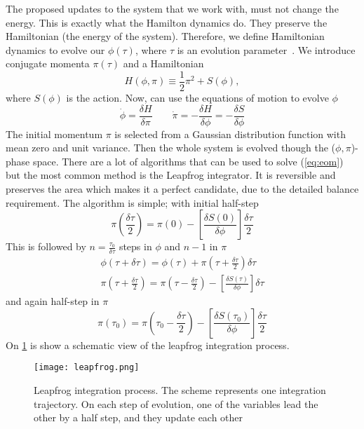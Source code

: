 The proposed updates to the system that we work with, must not change the energy. This is exactly what the Hamilton dynamics do. They preserve the Hamiltonian (the energy of the system). Therefore, we define Hamiltonian dynamics to evolve our $\phi(\tau)$, where $\tau$ is an evolution parameter~\cite{hmc}. We introduce conjugate momenta $\pi(\tau)$ and a Hamiltonian 
\begin{equation}
    H(\phi,\pi) \equiv \frac{1}{2}\pi^2 + S(\phi),
\end{equation}
where $S(\phi)$ is the action. Now, can use the equations of motion to evolve $\phi$
\begin{equation}
    \dot{\phi} = \frac{\delta H}{\delta \pi} \qquad \dot{\pi} = - \frac{\delta H}{\delta \phi} = - \frac{\delta S}{\delta \phi}
    \label{eq:eom}
\end{equation}
The initial momentum $\pi$ is selected from a Gaussian distribution function with mean zero and unit variance. Then the whole system is evolved though the ($\phi,\pi$)-phase space. There are a lot of algorithms that can be used to solve (\cref{eq:eom}) but the most common method is the Leapfrog integrator. It is reversible and preserves the area which makes it a perfect candidate, due to the detailed balance requirement. The algorithm is simple; with initial half-step
\begin{equation}
    \pi\left(\frac{\delta\tau}{2}\right) = \pi\left(0\right) - \left[ \frac{\delta S(0)}{\delta\phi} \right] \frac{\delta\tau}{2}
\end{equation}
This is followed by $n=\frac{\tau_0}{\delta\tau}$ steps in $\phi$ and $n-1$ in $\pi$
\begin{equation}
    \begin{aligned}
        \phi(\tau+\delta\tau) = \phi(\tau) + \pi(\tau+\frac{\delta\tau}{2})\delta\tau
        \\
        \pi(\tau+\frac{\delta\tau}{2}) = \pi(\tau-\frac{\delta\tau}{2}) - \left[ \frac{\delta S(\tau)}{\delta\phi} \right] \delta\tau
    \end{aligned}
\end{equation}
and again half-step in $\pi$
\begin{equation}
    \pi(\tau_0) = \pi(\tau_0-\frac{\delta\tau}{2}) - \left[ \frac{\delta S(\tau_0)}{\delta\phi} \right] \frac{\delta\tau}{2}
\end{equation}
On   \cref{fig:leapfrog} is show a schematic view of the leapfrog integration process.
\begin{figure}[htbp]
    \centerline{\texttt{[image: leapfrog.png]}}
    \caption{Leapfrog integration process. The scheme represents one integration trajectory. On each step of evolution, one of the variables lead the other by a half step, and they update each other~\cite{pic-leapfrog}
    }
    \label{fig:leapfrog}
\end{figure}

